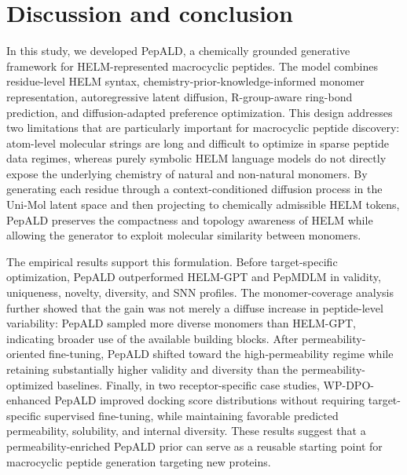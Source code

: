 \section{Discussion and conclusion}\label{sec:conclusion}

In this study, we developed PepALD, a chemically grounded generative framework for HELM-represented macrocyclic peptides. The model combines residue-level HELM syntax, chemistry-prior-knowledge-informed monomer representation, autoregressive latent diffusion, R-group-aware ring-bond prediction, and diffusion-adapted preference optimization. This design addresses two limitations that are particularly important for macrocyclic peptide discovery: atom-level molecular strings are long and difficult to optimize in sparse peptide data regimes, whereas purely symbolic HELM language models do not directly expose the underlying chemistry of natural and non-natural monomers. By generating each residue through a context-conditioned diffusion process in the Uni-Mol latent space and then projecting to chemically admissible HELM tokens, PepALD preserves the compactness and topology awareness of HELM while allowing the generator to exploit molecular similarity between monomers.

The empirical results support this formulation. Before target-specific optimization, PepALD outperformed HELM-GPT and PepMDLM in validity, uniqueness, novelty, diversity, and SNN profiles. The monomer-coverage analysis further showed that the gain was not merely a diffuse increase in peptide-level variability: PepALD sampled more diverse monomers than HELM-GPT, indicating broader use of the available building blocks. After permeability-oriented fine-tuning, PepALD shifted toward the high-permeability regime while retaining substantially higher validity and diversity than the permeability-optimized baselines. Finally, in two receptor-specific case studies, WP-DPO-enhanced PepALD improved docking score distributions without requiring target-specific supervised fine-tuning, while maintaining favorable predicted permeability, solubility, and internal diversity. These results suggest that a permeability-enriched PepALD prior can serve as a reusable starting point for macrocyclic peptide generation targeting new proteins.

